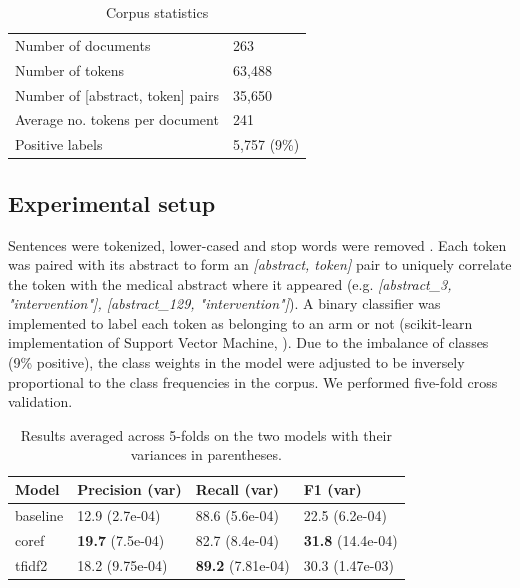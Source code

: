 \begin{table}[h]
  \begin{tabular}{l||l}
      \hline
      Number of documents & 263 \\
      Number of tokens & 63,488 \\
      Number of [abstract, token] pairs & 35,650 \\
      Average no. tokens per document & 241 \\
      Positive labels & 5,757 (9\%) \\\hline
  \end{tabular}
  \caption{Corpus statistics}
  \label{tab:3}
\end{table}
\vspace{-1em}

\subsection{Experimental setup}

Sentences were tokenized, lower-cased and stop words were removed . Each token was paired with its abstract to form an \textit{[abstract, token]} pair to uniquely correlate the token with the medical abstract where it appeared (e.g. \textit{[abstract\_3, "intervention"], [abstract\_129, "intervention"]}). A binary classifier was implemented to label each token as belonging to an arm or not (scikit-learn implementation of Support Vector Machine, ). Due to the imbalance of classes (9\% positive), the class weights in the model were adjusted to be inversely proportional to the class frequencies in the corpus. We performed five-fold cross validation.

\begin{table}[ht]
  \centering
    \begin{tabular}{l|l|l|l}
        \hline
        Model & Precision (var) & Recall (var)& F1 (var)\\\hline\hline
        baseline & 12.9 (2.7e-04) & 88.6 (5.6e-04) & 22.5 (6.2e-04)\\
        coref & \textbf{19.7} (7.5e-04) & 82.7 (8.4e-04) & \textbf{31.8} (14.4e-04)\\
        tfidf2 & 18.2 (9.75e-04) & \textbf{89.2} (7.81e-04) & 30.3 (1.47e-03) \\\hline
    \end{tabular}
    \caption{Results averaged across 5-folds on the two models with their variances in parentheses.}
  \label{tab:5}
\end{table}

